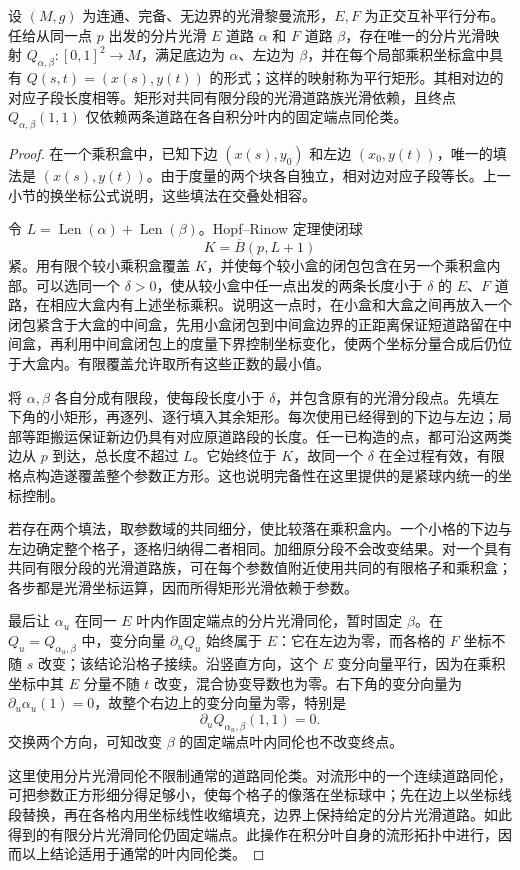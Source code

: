 \begin{lemma}\label{g3:lem:parallel-rectangle-extension}
	设 \((M,g)\) 为连通、完备、无边界的光滑黎曼流形，\(E,F\) 为正交互补平行分布。任给从同一点 \(p\) 出发的分片光滑 \(E\) 道路 \(\alpha\) 和 \(F\) 道路 \(\beta\)，存在唯一的分片光滑映射 \(Q_{\alpha,\beta}:[0,1]^2\to M\)，满足底边为 \(\alpha\)、左边为 \(\beta\)，并在每个局部乘积坐标盒中具有 \(Q(s,t)=(x(s),y(t))\) 的形式；这样的映射称为平行矩形。其相对边的对应子段长度相等。矩形对共同有限分段的光滑道路族光滑依赖，且终点 \(Q_{\alpha,\beta}(1,1)\) 仅依赖两条道路在各自积分叶内的固定端点同伦类。
\end{lemma}
\begin{proof}
	在一个乘积盒中，已知下边 \((x(s),y_0)\) 和左边 \((x_0,y(t))\)，唯一的填法是 \((x(s),y(t))\)。由于度量的两个块各自独立，相对边对应子段等长。上一小节的换坐标公式说明，这些填法在交叠处相容。

	令 \(L=\operatorname{Len}(\alpha)+\operatorname{Len}(\beta)\)。Hopf--Rinow 定理使闭球
	\[
		K=\overline B(p,L+1)
	\]
	紧。用有限个较小乘积盒覆盖 \(K\)，并使每个较小盒的闭包包含在另一个乘积盒内部。可以选同一个 \(\delta>0\)，使从较小盒中任一点出发的两条长度小于 \(\delta\) 的 \(E\)、\(F\) 道路，在相应大盒内有上述坐标乘积。说明这一点时，在小盒和大盒之间再放入一个闭包紧含于大盒的中间盒，先用小盒闭包到中间盒边界的正距离保证短道路留在中间盒，再利用中间盒闭包上的度量下界控制坐标变化，使两个坐标分量合成后仍位于大盒内。有限覆盖允许取所有这些正数的最小值。

	将 \(\alpha,\beta\) 各自分成有限段，使每段长度小于 \(\delta\)，并包含原有的光滑分段点。先填左下角的小矩形，再逐列、逐行填入其余矩形。每次使用已经得到的下边与左边；局部等距搬运保证新边仍具有对应原道路段的长度。任一已构造的点，都可沿这两类边从 \(p\) 到达，总长度不超过 \(L\)。它始终位于 \(K\)，故同一个 \(\delta\) 在全过程有效，有限格点构造遂覆盖整个参数正方形。这也说明完备性在这里提供的是紧球内统一的坐标控制。

	若存在两个填法，取参数域的共同细分，使比较落在乘积盒内。一个小格的下边与左边确定整个格子，逐格归纳得二者相同。加细原分段不会改变结果。对一个具有共同有限分段的光滑道路族，可在每个参数值附近使用共同的有限格子和乘积盒；各步都是光滑坐标运算，因而所得矩形光滑依赖于参数。

	最后让 \(\alpha_u\) 在同一 \(E\) 叶内作固定端点的分片光滑同伦，暂时固定 \(\beta\)。在 \(Q_u=Q_{\alpha_u,\beta}\) 中，变分向量 \(\partial_uQ_u\) 始终属于 \(E\)：它在左边为零，而各格的 \(F\) 坐标不随 \(s\) 改变；该结论沿格子接续。沿竖直方向，这个 \(E\) 变分向量平行，因为在乘积坐标中其 \(E\) 分量不随 \(t\) 改变，混合协变导数也为零。右下角的变分向量为
	\(\partial_u\alpha_u(1)=0\)，故整个右边上的变分向量为零，特别是
	\[
		\partial_uQ_{\alpha_u,\beta}(1,1)=0.
	\]
	交换两个方向，可知改变 \(\beta\) 的固定端点叶内同伦也不改变终点。

	这里使用分片光滑同伦不限制通常的道路同伦类。对流形中的一个连续道路同伦，可把参数正方形细分得足够小，使每个格子的像落在坐标球中；先在边上以坐标线段替换，再在各格内用坐标线性收缩填充，边界上保持给定的分片光滑道路。如此得到的有限分片光滑同伦仍固定端点。此操作在积分叶自身的流形拓扑中进行，因而以上结论适用于通常的叶内同伦类。
\end{proof}

